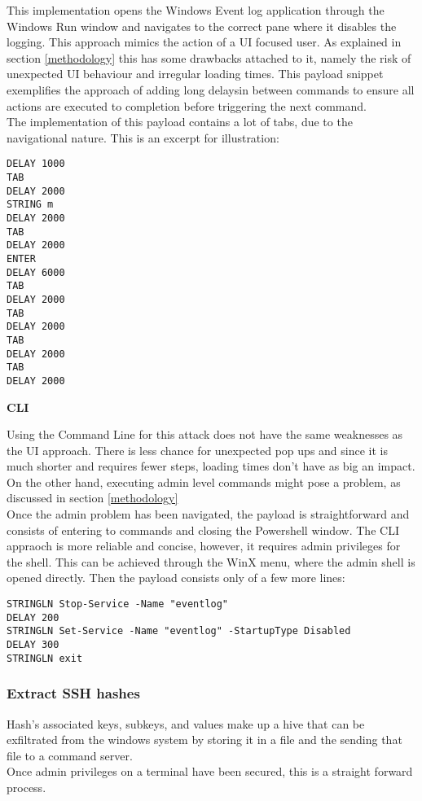 This implementation opens the Windows Event log application through the Windows Run window and navigates to the correct pane where it disables the logging.
This approach mimics the action of a UI focused user. As explained in section \ref{methodology} this has some drawbacks attached to it, namely the risk of unexpected UI behaviour and irregular loading times. This payload snippet exemplifies the approach of adding long delaysin between commands to ensure all actions are executed to completion before triggering the next command.\\
The implementation of this payload contains a lot of tabs, due to the navigational nature. This is an excerpt for illustration:

\begin{lstlisting}
DELAY 1000
TAB
DELAY 2000
STRING m
DELAY 2000
TAB
DELAY 2000
ENTER
DELAY 6000
TAB
DELAY 2000
TAB
DELAY 2000
TAB
DELAY 2000
TAB
DELAY 2000
\end{lstlisting}

\textbf{CLI}

Using the Command Line for this attack does not have the same weaknesses as the UI approach. There is less chance for unexpected pop ups and since it is much shorter and requires fewer steps, loading times don't have as big an impact. On the other hand, executing admin level commands might pose a problem, as discussed in section \ref{methodology} \\

Once the admin problem has been navigated, the payload is straightforward and consists of entering to commands and closing the Powershell window.
The CLI appraoch is more reliable and concise, however, it requires admin privileges for the shell. This can be achieved through the WinX menu, where the admin shell is opened directly. Then the payload consists only of a few more lines:

\begin{lstlisting}
STRINGLN Stop-Service -Name "eventlog"
DELAY 200
STRINGLN Set-Service -Name "eventlog" -StartupType Disabled
DELAY 300
STRINGLN exit
\end{lstlisting}


\subsubsection{Extract SSH hashes}

Hash's associated keys, subkeys, and values make up a hive that can be exfiltrated from the windows system by storing it in a file and the sending that file to a command server. \\
Once admin privileges on a terminal have been secured, this is a straight forward process. 


